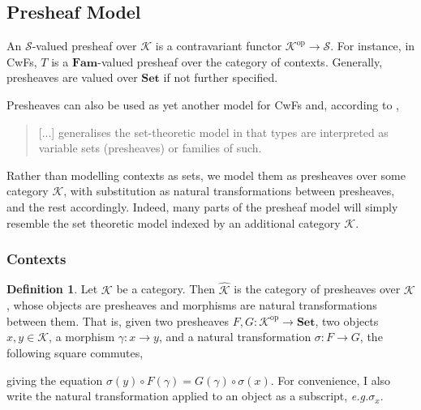 \documentclass{article}
\makeatletter
\newcommand{\eg}{\textit{e.g.}\@\xspace}
\renewcommand{\_}{\textrm{\textscale{.5}{\textunderscore}}}
\newcommand{\op}[1]{#1^{\mathrm{op}}}
\newcommand{\cat}[1]{\textbf{#1}}
\newcommand{\nt}{\sigma}
\theoremstyle{definition}
\newtheorem{definition}{Definition}[section]
\theoremstyle{plain}
\makeatother
\begin{document}
\subsection{Presheaf Model}

An $\mathcal{S}$-valued presheaf over $\mathcal{K}$ is a contravariant functor $\op{\mathcal{K}} \to \mathcal{S}$.
For instance, in CwFs, $T$ is a $\cat{Fam}$-valued presheaf over the category of contexts.
Generally, presheaves are valued over $\cat{Set}$ if not further specified.

Presheaves can also be used as yet another model for CwFs and, according to \citet{synsem},

\begin{quote}
    [...] generalises the set-theoretic model in that types are interpreted as variable sets (presheaves) or families of such.
\end{quote}

Rather than modelling contexts as sets,
we model them as presheaves over some category $\mathcal{K}$,
with substitution as natural transformations between presheaves,
and the rest accordingly.
Indeed, many parts of the presheaf model will simply resemble the set theoretic model
indexed by an additional category $\mathcal{K}$.

\subsubsection{Contexts}

\begin{definition}
Let $\mathcal{K}$ be a category.
Then $\widehat{\mathcal{K}}$ is the category of presheaves over $\mathcal{K}$,
whose objects are presheaves and morphisms are natural transformations between them.
That is, given two presheaves $F, G : \op{\mathcal{K}} \to \cat{Set}$,
two objects $x, y \in \mathcal{K}$, a morphism $\gamma : x \to y$, and a natural transformation $\nt : F \to G$,
the following square commutes,
\begin{center}
\end{center}
giving the equation $\nt(y) \circ F(\gamma) = G(\gamma) \circ \nt(x)$.
For convenience, I also write the natural transformation applied to an object as a subscript, \eg $\nt_x$.
\end{definition}
\end{document}

